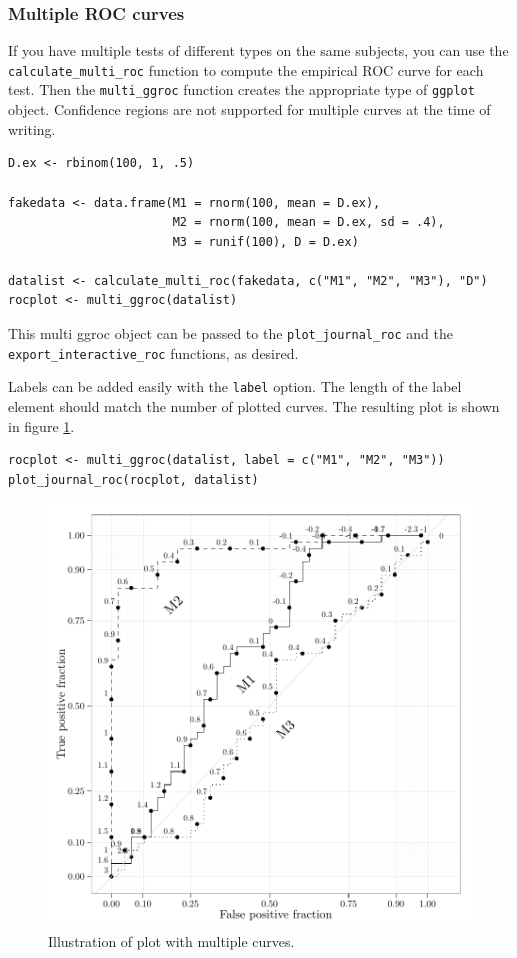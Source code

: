 \documentclass[article]{jss}
\begin{document}
\subsubsection{Multiple ROC curves}\label{multiple-roc-curves}

If you have multiple tests of different types on the same subjects, you
can use the \texttt{calculate\_multi\_roc} function to compute the
empirical ROC curve for each test. Then the \texttt{multi\_ggroc}
function creates the appropriate type of \texttt{ggplot} object.
Confidence regions are not supported for multiple curves at the time of
writing.

\begin{verbatim}
D.ex <- rbinom(100, 1, .5)

fakedata <- data.frame(M1 = rnorm(100, mean = D.ex), 
                       M2 = rnorm(100, mean = D.ex, sd = .4), 
                       M3 = runif(100), D = D.ex)

datalist <- calculate_multi_roc(fakedata, c("M1", "M2", "M3"), "D")
rocplot <- multi_ggroc(datalist)
\end{verbatim}

This multi ggroc object can be passed to the \texttt{plot\_journal\_roc}
and the \texttt{export\_interactive\_roc} functions, as desired.

Labels can be added easily with the \texttt{label} option. The length of
the label element should match the number of plotted curves. The
resulting plot is shown in figure \ref{multi}.

\begin{verbatim}
rocplot <- multi_ggroc(datalist, label = c("M1", "M2", "M3"))
plot_journal_roc(rocplot, datalist)
\end{verbatim}

\begin{figure}[htbp]
\centering
\includegraphics{figure/multi2-1.pdf}
\caption{Illustration of  plot with multiple curves.
\label{multi}}
\end{figure}
\end{document}
